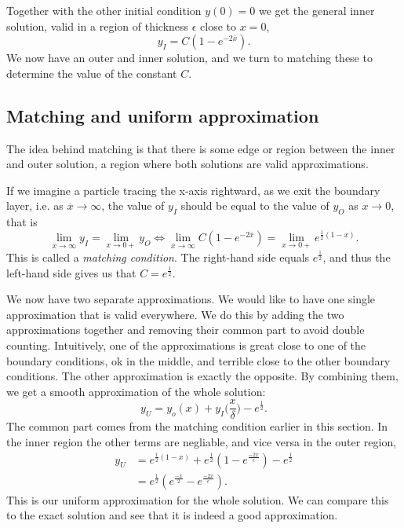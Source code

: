 \documentclass[12pt]{article}
\begin{document}
Together with the other initial condition $y(0)=0$ we get the general inner
solution, valid in a region of thickness $\epsilon$ close to $x=0$,
\begin{equation}
y_I = C(1 - e^{-2\overline{x}}).
\end{equation}
We now have an outer and inner solution, and we turn to matching these
to determine the value of the constant $C$.

\newpage
\subsection{Matching and uniform approximation}
The idea behind matching is that there is some edge or region between
the inner and outer solution, a region where both solutions are valid
approximations.

If we imagine a particle tracing the x-axis rightward, as we exit the boundary
layer, i.e. as $\overline{x} \to \infty$, the value of $y_I$ should be equal to
the value of $y_O$ as $x \to 0$, that is
\begin{equation}
\lim_{\overline{x} \to \infty} y_I = \lim_{x\to 0+} y_O \iff 
\lim_{\overline{x} \to \infty} C(1 - e^{-2\overline{x}}) = \lim_{x \to 0+} e^{\frac{1}{2}(1-x)}.
\end{equation}
This is called a \textit{matching condition}. The right-hand side equals
$e^{\frac{1}{2}}$, and thus the left-hand side gives us that $C =
e^{\frac{1}{2}}$.

We now have two separate approximations. We would like to have one
single approximation that is valid everywhere. We do this by adding
the two approximations together and removing their common part to
avoid double counting. Intuitively, one of the approximations is great
close to one of the boundary conditions, ok in the middle, and
terrible close to the other boundary conditions. The other
approximation is exactly the opposite. By combining them, we get a
smooth approximation of the whole solution:
\begin{equation}
y_U = y_o(x) + y_I\Big(\frac{x}{\delta}\Big) - e^{\frac{1}{2}}.
\end{equation}
The common part comes from the matching condition earlier in this
section. In the inner region the other terms are negliable, and vice
versa in the outer region,
\begin{align}
  y_U &= e^{\frac{1}{2}(1-x)} + e^{\frac{1}{2}}(1 - e^{\frac{-2x}{\epsilon}}) -
        e^{\frac{1}{2}} \\
      &=  e^{\frac{1}{2}}(e^{\frac{-x}{2}} - e^{\frac{-2x}{\epsilon}}).
\end{align}
This is our uniform approximation for the whole solution. We can
compare this to the exact solution and see that it is indeed a good
approximation.
\end{document}
